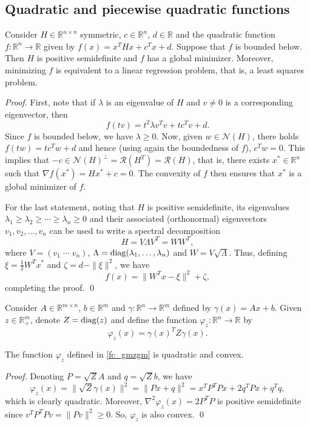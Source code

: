 \documentclass[smallextended,referee,envcountsect]{svjour3}
\newcommand{\R}{\mathbb{R}}
\newcommand{\rmv}[1]{{\color{red} #1}} %
\begin{document}
\subsection{Quadratic and piecewise quadratic functions}
\label{sec:basics}
\begin{lemma}
\label{lm:quad_least_squares}
Consider $H\in\R^{n\times n}$ symmetric, $c\in\R^n$, $d\in\R$ and the quadratic function 
$f:\R^n\to\R$ given by $f(x)=x^THx+c^Tx+d$. Suppose that $f$ is bounded below. Then $H$ 
is positive semidefinite and $f$ has a global minimizer. Moreover, minimizing $f$ is 
equivalent to a linear regression problem, that is, a least squares problem. 
\end{lemma}
\begin{proof}
First, note that if $\lambda$ is an eigenvalue of $H$ and $v\neq 0$ is a 
corresponding eigenvector, then 
$$
f(tv)=t^2\lambda v^Tv+tc^Tv+d.
$$
Since $f$ is bounded below, we have $\lambda\geq 0$. Now, given $w\in{\mathcal {N}}(H)$, 
there holds $f(tw)=tc^Tw+d$ and hence (using again the boundedness of $f$), $c^Tw=0$. 
This implies that $-c\in{\mathcal {N}}(H)^\perp={\mathcal{R}}(H^T)={\mathcal{R}}(H)$, that is, 
there exists $x^*\in\mathbb{R}^n$ such that $\nabla f( x^*)=Hx^*+c=0$. The convexity 
of $f$ then ensures that $x^*$ is a global minimizer of $f$. 

For the last statement, noting that $H$ is positive semidefinite, its eigenvalues 
$\lambda_1\geq\lambda_2\geq\cdots\geq\lambda_n\geq 0$ and their associated (orthonormal) 
eigenvectors $v_1, v_2, \ldots, v_n$ can be used to write a spectral decomposition 
$$
H = V\Lambda V^T = WW^T,
$$
where $V=(v_1\;\cdots\;v_n)$, $\Lambda={\rm diag}(\lambda_1,\ldots,\lambda_n)$ 
and $W = V\sqrt{\Lambda}$. Thus, defining $\xi = \frac{1}{2}W^Tx^*$ and 
$\zeta = d -\|\xi\|^2$, we have 
$$
f(x) = \|W^Tx - \xi\|^2 + \zeta,
$$
completing the proof.
\qed\end{proof}

Consider $A\in\R^{m\times n}$, $b\in\R^m$ and $\gamma:\R^n\to\R^m$ defined by 
$\gamma(x)=Ax+b$. Given $z\in\R_+^m$, denote $Z={\rm diag}(z)$ and define the function 
$\varphi_z:\R^n\to\R$ by 
\begin{equation}
\label{fc_gmzgm}
\varphi_z(x)=\gamma(x)^TZ\gamma(x).
\end{equation}

\begin{lemma}
\label{lm:gmzgm}
The function $\varphi_z$ defined in \eqref{fc_gmzgm} is quadratic and convex. 
\end{lemma}
\begin{proof}
Denoting $P=\sqrt{Z}A$ and $q=\sqrt{Z}b$, we have 
$$
\varphi_z(x)=\|\sqrt{Z}\gamma(x)\|^2=\|Px+q\|^2=x^TP^TPx+2q^TPx+q^Tq,
$$
which is clearly quadratic. Moreover, $\nabla^2\varphi_z(x)=2P^TP$ is positive 
semideﬁnite since $v^T{P^TP}v=\|Pv\|^2\geq 0$. So, $\varphi_z$ is also convex.
\qed\end{proof}
\end{document}
